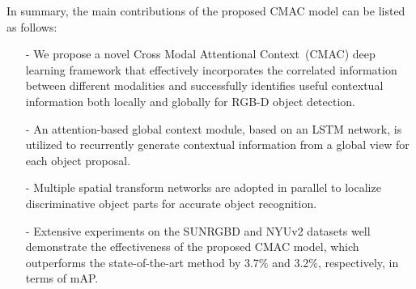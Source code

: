 \documentclass[journal]{IEEEtran}
\begin{document}
In summary, the main contributions of the proposed CMAC model can be listed as follows:







\begin{itemize}
\item[-] We propose a novel Cross Modal Attentional Context~(CMAC) deep learning framework that effectively incorporates the correlated information between different modalities and successfully identifies useful contextual information both locally and globally for RGB-D object detection.
\item[-] An attention-based global context module, based on an LSTM network, is utilized to recurrently generate contextual information from a global view for each object proposal.
\item[-] Multiple spatial transform networks are adopted in parallel to localize discriminative object parts for accurate object recognition. 
\item[-] Extensive experiments on the SUNRGBD and NYUv2 datasets well demonstrate the effectiveness of the proposed CMAC model, which outperforms the state-of-the-art method \cite{gupta2016cross} by 3.7\% and 3.2\%, respectively, in terms of mAP. 
\end{itemize}
\end{document}
